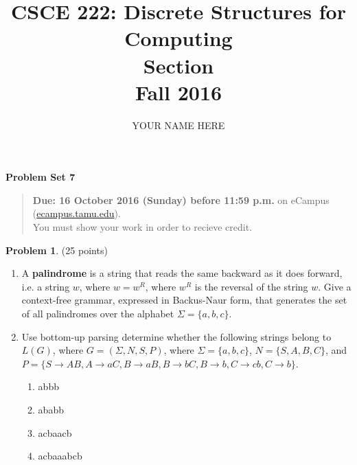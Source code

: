 \documentclass{article}
\title{CSCE 222: Discrete Structures for Computing\\Section \mysectionnumber\\Fall 2016}
\author{YOUR NAME HERE}
\theoremstyle{definition}
\newtheorem{problem}{Problem}
\newtheorem*{solution}{Solution}
\newcommand{\problemset}[1]{\begin{center}\textbf{Problem Set #1}\end{center}}
\newcommand{\duedate}[1]{\begin{quote}\textbf{Due: #1} on eCampus (\url{ecampus.tamu.edu}). \\You must show your work in order to recieve credit.\end{quote}}
\begin{document}
\maketitle

\problemset{7}

\duedate{16 October 2016 (Sunday) before 11:59 p.m.}

\bigskip

\begin{problem} (25 points)\\
\begin{enumerate}
\item A \textbf{palindrome} is a string that reads the same backward as it does forward, i.e. a string $w$, where $w=w^R$, where $w^R$ is the reversal of the string $w$.  Give a context-free grammar, expressed in Backus-Naur form, that generates the set of all palindromes over the alphabet $\Sigma=\{a,b,c\}$.
\item Use bottom-up parsing determine whether the following strings belong to $L(G)$, where $G=(\Sigma,N,S,P)$, where $\Sigma=\{a,b,c\}$, $N=\{S,A,B,C\}$, and $P=\{S\to AB,A\to aC,B\to aB, B\to bC, B\to b, C \to cb, C\to b\}$.
\begin{enumerate}
\item abbb
\item ababb
\item acbaacb
\item acbaaabcb
\end{enumerate}
\end{enumerate}
\end{problem}



\end{document}
